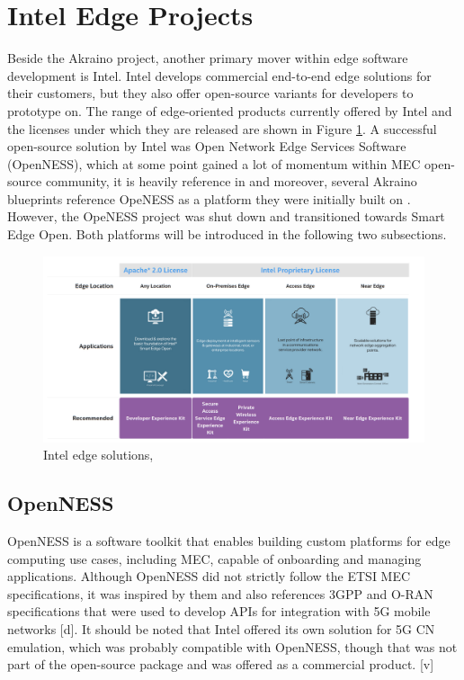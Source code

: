 \documentclass[12pt,a4paper,twoside]{report}
\begin{document}
\section{Intel Edge Projects}
Beside the Akraino project, another primary mover within edge software development is Intel. Intel develops commercial end-to-end edge solutions for their customers, but they also offer open-source variants for developers to prototype on. The range of edge-oriented products currently offered by Intel and the licenses under which they are released are shown in Figure \ref{F:intel-solu}. A successful open-source solution by Intel was Open Network Edge Services Software (OpenNESS), which at some point gained a lot of momentum within MEC open-source community, it is heavily reference in \cite{sabella-mec-sw-dev} and moreover, several Akraino blueprints reference OpeNESS as a platform they were initially built on \cite{cvb-docu,akraino-mec-slice-docu}. However, the OpeNESS project was shut down and transitioned towards Smart Edge Open. Both platforms will be introduced in the following two subsections.
\begin{figure}[ht]
	\centering
	\includegraphics[width=13cm]{./images/intel-solu.png} 
	\caption{Intel edge solutions, \cite{}} %
	\label{F:intel-solu}
\end{figure}

\subsection{OpenNESS}
OpenNESS is a software toolkit that enables building custom platforms for edge computing use cases, including MEC, capable of onboarding and managing applications. Although OpenNESS did not strictly follow the ETSI MEC specifications, it was inspired by them and also references 3GPP and O-RAN specifications that were used to develop APIs for integration with 5G mobile networks [d]. It should be noted that Intel offered its own solution for 5G CN emulation, which was probably compatible with OpenNESS, though that was not part of the open-source package and was offered as a commercial product. [v] 
\end{document}
